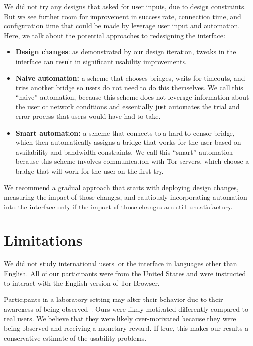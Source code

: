 \documentclass[USenglish,oneside,twocolumn]{article}
\begin{document}
We did not try any designs that asked for user inputs, due to design constraints. But we see further room for improvement in success rate, connection time, and configuration time that could be made by leverage user input and automation. Here, we talk about the potential approaches to redesigning the interface:  \\

\begin{itemize}
\item{\bfseries Design changes:} as demonstrated by our design iteration, tweaks in the interface can result in significant usability improvements.
\item{\bfseries Naive automation:} a scheme that chooses bridges, waits for timeouts, and tries another bridge so users do not need to do this themselves. We call this ``naive'' automation, because this scheme does not leverage information about the user or network conditions and essentially just automates the trial and error process that users would have had to take. 
\item{\bfseries Smart automation:} a scheme that connects to a hard-to-censor bridge, which then automatically assigns a bridge that works for the user based on availability and bandwidth constraints. We call this ``smart'' automation because this scheme involves communication with Tor servers, which choose a bridge that will work for the user on the first try. 
\end{itemize}

We recommend a gradual approach that starts with deploying design changes, measuring the impact of those changes, and cautiously incorporating automation into the interface only if the impact of those changes are still unsatisfactory. 

\section{Limitations}
\label{sec:limitations}
We did not study international users, or the interface in languages other than English. All of our participants were from the United States and were instructed to interact with the English version of Tor Browser.

Participants in a laboratory setting may alter their behavior due to their awareness of being observed~\cite{mccarney2007hawthorne}. Ours were likely motivated differently compared to real users. We believe that they were likely over-motivated because they were being observed and receiving a monetary reward. If true, this makes our results a conservative estimate of the usability problems. 
\end{document}
